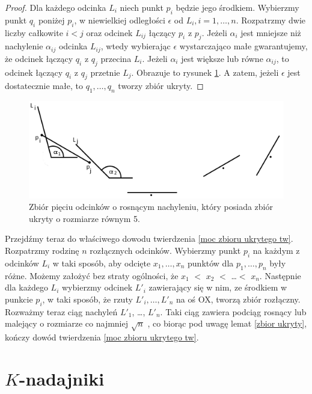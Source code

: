 \documentclass{xmgr}
\theoremstyle{definition}
\begin{document}
\begin{proof}
	Dla każdego odcinka $L_i$ niech punkt $p_i$ będzie jego środkiem. Wybierzmy punkt $q_i$ poniżej $p_i$, w niewielkiej odległości $\epsilon$ od $L_i, i = 1,\ldots,n$. Rozpatrzmy dwie liczby całkowite $i < j$ oraz odcinek $L_{ij}$ łączący $p_i$ z $p_j$. Jeżeli $\alpha_i$ jest mniejsze niż nachylenie $\alpha_{ij}$ odcinka $L_{ij}$, wtedy wybierając $\epsilon$ wystarczająco małe gwarantujemy, że odcinek łączący $q_i$ z $q_j$ przecina $L_i$. Jeżeli $\alpha_i$ jest większe lub równe $\alpha_{ij}$, to odcinek łączący $q_i$ z $q_j$ przetnie $L_j$. Obrazuje to rysunek \ref{fig:5 zbior ukryty}. A zatem, jeżeli $\epsilon$ jest dostatecznie małe, to  $q_1, \ldots, q_n$ tworzy zbiór ukryty. 
\end{proof}
\begin{figure}[ht!]
  \centering
   \includegraphics{rysunki/5_odcinkow_zbior_ukryty.png}
   \caption{Zbiór pięciu odcinków o rosnącym nachyleniu, który posiada zbiór ukryty o rozmiarze równym 5.}
   \label{fig:5 zbior ukryty}
\end{figure}
\indent Przejdźmy teraz do właściwego dowodu twierdzenia \ref{moc zbioru ukrytego tw}. Rozpatrzmy rodzinę $n$ rozłącznych odcinków. Wybierzmy punkt $p_i$ na każdym z odcinków $L_i$ w taki sposób, aby odcięte $x_1,\ldots, x_n$ punktów dla $p_1,\ldots,p_n$ były różne. Możemy założyć bez straty ogólności, że $x_1$ $<$ $x_2$ $<$ \ldots $<$ $x_n$. Następnie dla każdego $L_i$ wybierzmy odcinek $L'_i$ zawierający się w nim, ze środkiem w punkcie $p_i$, w taki sposób, że rzuty $L'_i,\ldots,L'_n$ na oś OX, tworzą zbiór rozłączny. Rozważmy teraz ciąg nachyleń $L'_1$, \ldots, $L'_n$. Taki ciąg zawiera podciąg rosnący lub malejący o rozmiarze co najmniej $\sqrt{n}$ \cite{illumination}, co biorąc pod uwagę lemat \ref{zbior ukryty}, kończy dowód twierdzenia \ref{moc zbioru ukrytego tw}.

\chapter{$K$-nadajniki}
\end{document}
